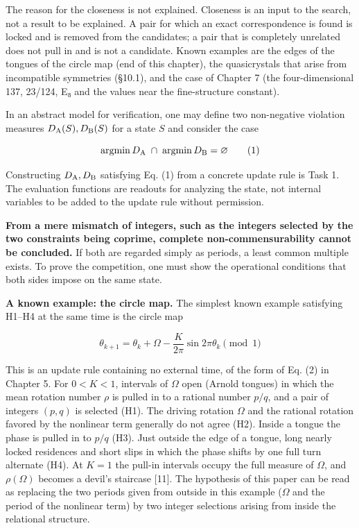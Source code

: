 \documentclass[
  a4paper,
]{article}
\begin{document}
The reason for the closeness is not explained. Closeness is an input to
the search, not a result to be explained. A pair for which an exact
correspondence is found is locked and is removed from the candidates; a
pair that is completely unrelated does not pull in and is not a
candidate. Known examples are the edges of the tongues of the circle map
(end of this chapter), the quasicrystals that arise from incompatible
symmetries (§10.1), and the case of Chapter 7 (the four-dimensional 137,
23/124, E₈ and the values near the fine-structure constant).

In an abstract model for verification, one may define two non-negative
violation measures \(D_{\rm A}(S),D_{\rm B}(S)\) for a state \(S\) and
consider the case

\[
\operatorname*{argmin}D_{\rm A}
\;\cap\;
\operatorname*{argmin}D_{\rm B}
=\varnothing
\tag{1}
\]

Constructing \(D_{\rm A},D_{\rm B}\) satisfying Eq. (1) from a concrete
update rule is Task 1. The evaluation functions are readouts for
analyzing the state, not internal variables to be added to the update
rule without permission.

\textbf{From a mere mismatch of integers, such as the integers selected
by the two constraints being coprime, complete non-commensurability
cannot be concluded.} If both are regarded simply as periods, a least
common multiple exists. To prove the competition, one must show the
operational conditions that both sides impose on the same state.

\textbf{A known example: the circle map.} The simplest known example
satisfying H1--H4 at the same time is the circle map

\[
\theta_{k+1}=\theta_k+\Omega-\frac{K}{2\pi}\sin2\pi\theta_k\pmod 1
\]

This is an update rule containing no external time, of the form of Eq.
(2) in Chapter 5. For \(0<K<1\), intervals of \(\Omega\) open (Arnold
tongues) in which the mean rotation number \(\rho\) is pulled in to a
rational number \(p/q\), and a pair of integers \((p,q)\) is selected
(H1). The driving rotation \(\Omega\) and the rational rotation favored
by the nonlinear term generally do not agree (H2). Inside a tongue the
phase is pulled in to \(p/q\) (H3). Just outside the edge of a tongue,
long nearly locked residences and short slips in which the phase shifts
by one full turn alternate (H4). At \(K=1\) the pull-in intervals occupy
the full measure of \(\Omega\), and \(\rho(\Omega)\) becomes a devil's
staircase {[}11{]}. The hypothesis of this paper can be read as
replacing the two periods given from outside in this example (\(\Omega\)
and the period of the nonlinear term) by two integer selections arising
from inside the relational structure.
\end{document}
